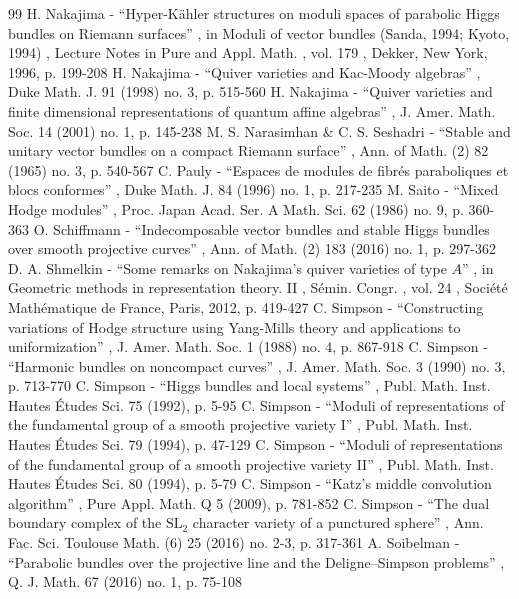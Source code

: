\documentclass[11pt]{article}
\theoremstyle{definition}
\theoremstyle{plain}
\begin{document}
\begin{thebibliography}{99}
 H. Nakajima - “Hyper-Kähler structures on moduli spaces of parabolic Higgs bundles on Riemann surfaces” , in Moduli of vector bundles (Sanda, 1994; Kyoto, 1994) , Lecture Notes in Pure and Appl. Math. , vol. 179 , Dekker, New York, 1996, p. 199-208
 H. Nakajima - “Quiver varieties and Kac-Moody algebras” , Duke Math. J. 91 (1998) no. 3, p. 515-560
 H. Nakajima - “Quiver varieties and finite dimensional representations of quantum affine algebras” , J. Amer. Math. Soc. 14 (2001) no. 1, p. 145-238
 M. S. Narasimhan \& C. S. Seshadri - “Stable and unitary vector bundles on a compact Riemann surface” , Ann. of Math. (2) 82 (1965) no. 3, p. 540-567
 C. Pauly - “Espaces de modules de fibrés paraboliques et blocs conformes” , Duke Math. J. 84 (1996) no. 1, p. 217-235
 M. Saito - “Mixed Hodge modules” , Proc. Japan Acad. Ser. A Math. Sci. 62 (1986) no. 9, p. 360-363
 O. Schiffmann - “Indecomposable vector bundles and stable Higgs bundles over smooth projective curves” , Ann. of Math. (2) 183 (2016) no. 1, p. 297-362
 D. A. Shmelkin - “Some remarks on Nakajima’s quiver varieties of type $A$” , in Geometric methods in representation theory. II , Sémin. Congr. , vol. 24 , Société Mathématique de France, Paris, 2012, p. 419-427
 C. Simpson - “Constructing variations of Hodge structure using Yang-Mills theory and applications to uniformization” , J. Amer. Math. Soc. 1 (1988) no. 4, p. 867-918
 C. Simpson - “Harmonic bundles on noncompact curves” , J. Amer. Math. Soc. 3 (1990) no. 3, p. 713-770
 C. Simpson - “Higgs bundles and local systems” , Publ. Math. Inst. Hautes Études Sci. 75 (1992), p. 5-95
 C. Simpson - “Moduli of representations of the fundamental group of a smooth projective variety I” , Publ. Math. Inst. Hautes Études Sci. 79 (1994), p. 47-129
 C. Simpson - “Moduli of representations of the fundamental group of a smooth projective variety II” , Publ. Math. Inst. Hautes Études Sci. 80 (1994), p. 5-79
 C. Simpson - “Katz’s middle convolution algorithm” , Pure Appl. Math. Q 5 (2009), p. 781-852
 C. Simpson - “The dual boundary complex of the $\mathrm{SL}_2$ character variety of a punctured sphere” , Ann. Fac. Sci. Toulouse Math. (6) 25 (2016) no. 2-3, p. 317-361
 A. Soibelman - “Parabolic bundles over the projective line and the Deligne–Simpson problems” , Q. J. Math. 67 (2016) no. 1, p. 75-108

\end{thebibliography}
\end{document}
